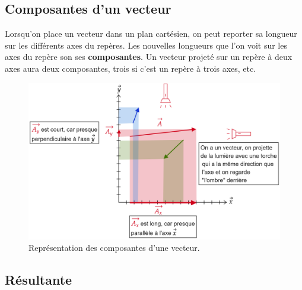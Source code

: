\documentclass[
	11pt, %
	fleqn, %
	a4paper, %
]{LegrandOrangeBook}
\begin{document}
\subsection{Composantes d'un vecteur}


\begin{theorem}
Lorsqu’on place un vecteur dans un plan cartésien, on peut reporter sa longueur sur les différents axes du repères. Les nouvelles longueurs que l'on voit sur les axes du repère son ses \textbf{composantes}. Un vecteur projeté sur un repère à deux axes aura deux composantes, trois si c'est un repère à trois axes, etc.
\end{theorem}

\begin{figure}[H] %
	\centering %
	\includegraphics[width=1\textwidth]{Images/compo1.png} %
	\caption{Représentation des composantes d'une vecteur.}
	\label{compo1} %
\end{figure}





\subsection{Résultante}
\end{document}
